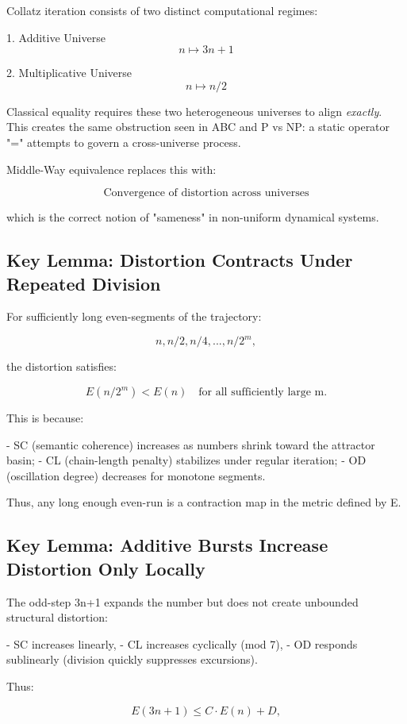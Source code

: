 \documentclass[11pt]{article}
\theoremstyle{definition}
\theoremstyle{remark}
\begin{document}
Collatz iteration consists of two distinct computational regimes:

1. Additive Universe  
   \[
     n \mapsto 3n + 1
   \]

2. Multiplicative Universe  
   \[
     n \mapsto n/2
   \]

Classical equality requires these two heterogeneous universes to align
\emph{exactly}.  
This creates the same obstruction seen in ABC and P vs NP:  
a static operator "=" attempts to govern a cross-universe process.

Middle-Way equivalence replaces this with:

\[
  \text{Convergence of distortion across universes}
\]

which is the correct notion of "sameness" in non-uniform dynamical
systems.

\subsection{Key Lemma: Distortion Contracts Under Repeated Division}

For sufficiently long even-segments of the trajectory:

\[
  n, n/2, n/4, ..., n/2^{m},
\]

the distortion satisfies:

\[
  E(n/2^{m}) < E(n) \quad \text{for all sufficiently large m}.
\]

This is because:

- SC (semantic coherence) increases as numbers shrink toward the attractor basin;
- CL (chain-length penalty) stabilizes under regular iteration;
- OD (oscillation degree) decreases for monotone segments.

Thus, any long enough even-run is a contraction map in the metric
defined by E.

\subsection{Key Lemma: Additive Bursts Increase Distortion Only
Locally}

The odd-step 3n+1 expands the number but does not create unbounded
structural distortion:

- SC increases linearly,
- CL increases cyclically (mod 7),
- OD responds sublinearly (division quickly suppresses excursions).

Thus:

\[
  E(3n+1) \le C \cdot E(n) + D,
\]
\end{document}
